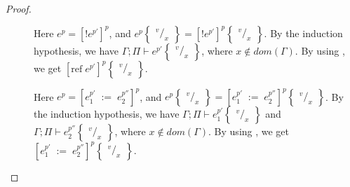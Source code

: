 \documentclass[../../master.tex]{subfiles}
\begin{document}
\begin{proof}
\begin{description}
		\item[] Here $e^p=[!e^{p'}]^{p}$, and $e^p\begin{Bmatrix} ^v/_x \end{Bmatrix}=[!e^{p'}]^{p}\begin{Bmatrix} ^v/_x \end{Bmatrix}$.
		By the induction hypothesis, we have $\Gamma;\Pi\vdash e^{p'}\begin{Bmatrix} ^v/_x \end{Bmatrix}$, where $x\notin dom(\Gamma)$.
		By using , we get $[\mbox{ref}\;e^{p'}]^{p}\begin{Bmatrix} ^v/_x \end{Bmatrix}$.

		\item[] Here $e^p=[e_1^{p'}\;:=\;e_2^{p''}]^{p}$, and $e^p\begin{Bmatrix} ^v/_x \end{Bmatrix}=[e_1^{p'}\;:=\;e_2^{p''}]^{p}\begin{Bmatrix} ^v/_x \end{Bmatrix}$.
		By the induction hypothesis, we have $\Gamma;\Pi\vdash e_1^{p'}\begin{Bmatrix} ^v/_x \end{Bmatrix}$ and $\Gamma;\Pi\vdash e_2^{p''}\begin{Bmatrix} ^v/_x \end{Bmatrix}$, where $x\notin dom(\Gamma)$.
		By using , we get $[e_1^{p'}\;:=\;e_2^{p''}]^{p}\begin{Bmatrix} ^v/_x \end{Bmatrix}$.
	\end{description}
\end{proof}
\end{document}

